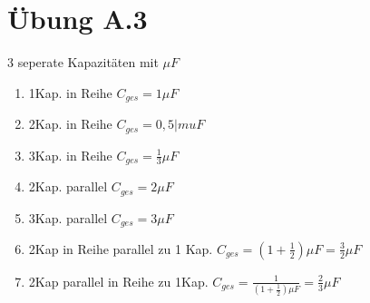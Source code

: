 \documentclass{article}
\begin{document}
\section{Übung A.3}
3 seperate Kapazitäten mit $\mu F$
\begin{enumerate}
\item 1Kap. in Reihe $C_{ges} = 1\mu F$
\item 2Kap. in Reihe $C_{ges} = 0,5|mu F$
\item 3Kap. in Reihe $C_{ges} = \frac{1}{3}\mu F$
\item 2Kap. parallel $C_{ges} = 2\mu F$
\item 3Kap. parallel $C_{ges} = 3\mu F$
\item 2Kap in Reihe parallel zu 1 Kap. $C_{ges}=(1+\frac{1}{2})\mu F=\frac{3}{2}\mu F$
\item 2Kap parallel in Reihe zu 1Kap. $C_{ges}= \frac{1}{(1+\frac{1}{2})\mu F}=\frac{2}{3}\mu F$
\end{enumerate}
\end{document}
